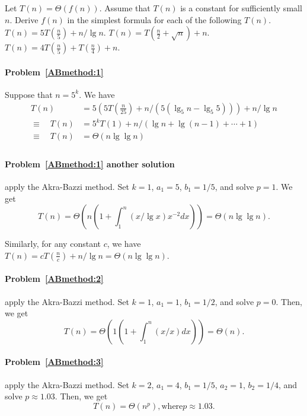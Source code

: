 \begin{Exercise}
Let $T(n) = \Theta(f(n))$. Assume that $T(n)$ is a constant for sufficiently small $n$. Derive $f(n)$ in the simplest formula for each of the following $T(n)$.
\Question $T(n) = 5T(\frac{n}{5}) + n/\lg n$. \label{ABmethod:1} 
\Question $T(n) = T(\frac{n}{2} + \sqrt{n}) + n$. \label{ABmethod:2} 
\Question $T(n) = 4T(\frac{n}{5}) + T(\frac{n}{4}) + n$. \label{ABmethod:3} 
\end{Exercise}
\begin{Answer}
\paragraph{Problem~\ref{ABmethod:1}} Suppose that $n = 5^k$. We have
\begin{align*}
 T(n)  & = 5(5T(\frac{n}{25}) + n/(5(\lg_5 n - \lg_5 5))) + n/\lg n \\
\equiv \quad T(n) & = 5^kT(1) + n/(\lg n + \lg (n-1) + \cdots + 1) \\
\equiv  \quad T(n) &=  \Theta(n \lg \lg n) \\
\end{align*}

\paragraph{Problem~\ref{ABmethod:1} another solution} apply the Akra\--Bazzi method. Set $k = 1$, $a_1 = 5$, $b_1 = 1/5$, and solve $p = 1$. We get
\[ T(n) = \Theta( n (1 + \int_{1}^n (x / \lg x) x^{-2} dx)) = \Theta(n \lg \lg n). \]
\begin{remark} Similarly, for any constant $c$, we have $T(n) = cT(\frac{n}{c}) + n/\lg n = \Theta(n \lg \lg n)$.
\end{remark}

\paragraph{Problem~\ref{ABmethod:2}} apply the Akra\--Bazzi method. Set $k = 1$, $a_1 = 1$, $b_1 = 1/2$, and solve $p = 0$. Then, we get
\[ T(n) = \Theta( 1 (1 + \int_{1}^n (x / x) dx)) = \Theta(n). \]

\paragraph{Problem~\ref{ABmethod:3}} apply the Akra\--Bazzi method. Set $k = 2$, $a_1 = 4$, $b_1 = 1/5$, $a_2 = 1$, $b_2 = 1/4$, and solve $p \approx 1.03$. Then, we get
\[ T(n) = \Theta( n^{p}), \text{where} p \approx 1.03. \]

\end{Answer}

